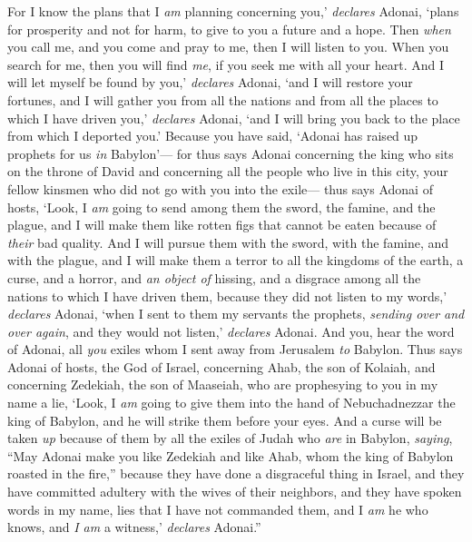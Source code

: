 \begin{biblechapter}
\verse For I know the plans that I \textit{am} planning concerning you,’ \textit{declares} Adonai, ‘plans for prosperity and not for harm, to give to you a future and a hope.
\verse Then \textit{when} you call me, and you come and pray to me, then I will listen to you.
\verse When you search for me, then you will find \textit{me}, if you seek me with all your heart.
\verse And I will let myself be found by you,’ \textit{declares} Adonai, ‘and I will restore your fortunes, and I will gather you from all the nations and from all the places to which I have driven you,’ \textit{declares} Adonai, ‘and I will bring you back to the place from which I deported you.’
\verse Because you have said, ‘Adonai has raised up prophets for us \textit{in} Babylon’—
\verse for thus says Adonai concerning the king who sits on the throne of David and concerning all the people who live in this city, your fellow kinsmen who did not go with you into the exile—
\verse thus says Adonai of hosts, ‘Look, I \textit{am} going to send among them the sword, the famine, and the plague, and I will make them like rotten figs that cannot be eaten because of \textit{their} bad quality.
\verse And I will pursue them with the sword, with the famine, and with the plague, and I will make them a terror to all the kingdoms of the earth, a curse, and a horror, and \textit{an object of} hissing, and a disgrace among all the nations to which I have driven them,
\verse because they did not listen to my words,’ \textit{declares} Adonai, ‘when I sent to them my servants the prophets, \textit{sending over and over again}, and they would not listen,’ \textit{declares} Adonai.
\verse And you, hear the word of Adonai, all \textit{you} exiles whom I sent away from Jerusalem \textit{to} Babylon.
\verse Thus says Adonai of hosts, the God of Israel, concerning Ahab, the son of Kolaiah, and concerning Zedekiah, the son of Maaseiah, who are prophesying to you in my name a lie, ‘Look, I \textit{am} going to give them into the hand of Nebuchadnezzar the king of Babylon, and he will strike them before your eyes.
\verse And a curse will be taken \textit{up} because of them by all the exiles of Judah who \textit{are} in Babylon, \textit{saying}, “May Adonai make you like Zedekiah and like Ahab, whom the king of Babylon roasted in the fire,”
\verse because they have done a disgraceful thing in Israel, and they have committed adultery with the wives of their neighbors, and they have spoken words in my name, lies that I have not commanded them, and I \textit{am} he who knows, and \textit{I am} a witness,’ \textit{declares} Adonai.”

\end{biblechapter}
